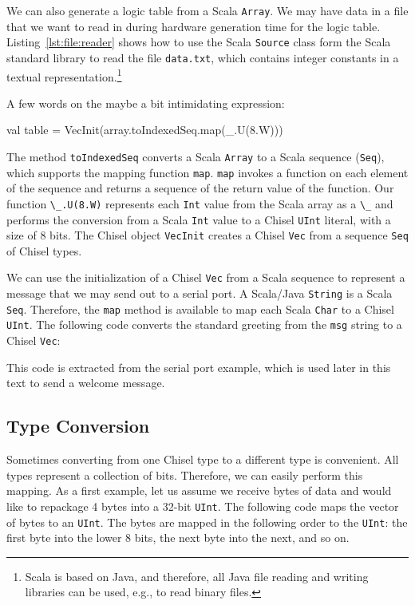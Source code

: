 \documentclass[%
    10pt,
    headinclude, footexclude,
    openright, %
    notitlepage,
    cleardoubleempty,
    headsepline,
    pointlessnumbers,
    bibtotoc, idxtotoc,
    ]{scrbook}
\newcommand{\code}[1]{{\lstinline[basicstyle=\small\ttfamily]{#1}}}
\begin{document}

We can also generate a logic table from a Scala \code{Array}.
We may have data in a file that we want to read in during hardware generation
time for the logic table.
Listing~\ref{lst:file:reader} shows how to use the Scala \code{Source}
class form the Scala standard library to read the file \code{data.txt}, which
contains integer constants in a textual representation.\footnote{Scala is
based on Java, and therefore, all Java file reading and writing libraries can
be used, e.g., to read binary files.}

A few words on the maybe a bit intimidating expression:
\begin{chisel}
  val table = VecInit(array.toIndexedSeq.map(_.U(8.W)))
\end{chisel}


\noindent The method \code{toIndexedSeq} converts a Scala \code{Array}
to a Scala sequence (\code{Seq}),
which supports the mapping function \code{map}.
\code{map} invokes a function on each element of the sequence and returns
a sequence of the return value of the function. Our function \code{\_.U(8.W)} represents
each \code{Int} value from the Scala array as a \code{\_} and performs the conversion
from a Scala \code{Int} value to a Chisel \code{UInt} literal, with a size of 8 bits.
The Chisel object \code{VecInit} creates a Chisel \code{Vec} from a sequence \code{Seq}
of Chisel types.

We can use the initialization of a Chisel \code{Vec} from a Scala sequence to represent
a message that we may send out to a serial port.
A Scala/Java \code{String} is a Scala \code{Seq}.
Therefore, the \code{map}
method is available to map each Scala \code{Char} to a Chisel \code{UInt}.
The following code converts the standard greeting
from the \code{msg} string to a Chisel \code{Vec}:


\noindent This code is extracted from the serial port example, which is used later in this text to send a welcome message.

\subsection{Type Conversion}

Sometimes converting from one Chisel type to a different type is convenient.
All types represent a collection of bits. Therefore, we can easily perform this mapping.
As a first example, let us assume we receive bytes of data and would like to repackage
4 bytes into a 32-bit \code{UInt}. The following code maps the vector of bytes to an \code{UInt}.
The bytes are mapped in the following order to the \code{UInt}: the first byte into the lower 8 bits,
the next byte into the next, and so on.
\end{document}
